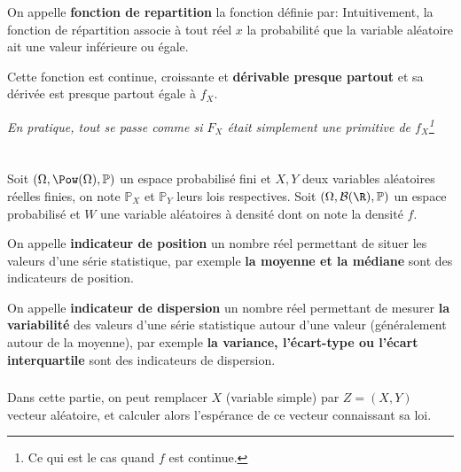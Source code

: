 \subsection*{} 
On appelle \textbf{fonction de repartition} la fonction définie par:
Intuitivement, la fonction de répartition associe à tout réel \(x\) la probabilité que la variable aléatoire ait une valeur inférieure ou égale.\<

Cette fonction est continue, croissante et \textbf{dérivable presque partout} et sa dérivée est presque partout égale à \(f_X\).
\begin{center}
   \textit{En pratique, tout se passe comme si \(F_X\) était simplement\+ une primitive de \(f_X\)\footnote[3]{Ce qui est le cas quand \(f\) est continue.}}
\end{center}

\chapter*{} %

Soit \((\Omega, \Pow(\Omega), \mathbb{P})\) un espace probabilisé fini et \(X, Y\) deux variables aléatoires réelles finies, on note \(\mathbb{P}_X\) et \(\mathbb{P}_Y\) leurs lois respectives. \+
Soit \((\Omega, \mathcal{B}(\R), \mathbb{P})\) un espace probabilisé et \(W\) une variable aléatoires à densité dont on note la densité \(f\). \<

On appelle \textbf{indicateur de position} un nombre réel permettant de situer les valeurs d'une série statistique, par exemple \textbf{la moyenne et la médiane} sont des indicateurs de position.\<

On appelle \textbf{indicateur de dispersion} un nombre réel permettant de mesurer \textbf{la variabilité} des valeurs d'une série statistique autour d'une valeur (généralement autour de la moyenne), par exemple \textbf{la variance, l'écart-type ou l'écart interquartile} sont des indicateurs de dispersion.

\subsection*{}
Dans cette partie, on peut remplacer \(X\) (variable simple) par \(Z = (X, Y)\) vecteur aléatoire, et calculer alors l'espérance de ce vecteur connaissant sa loi.\<


